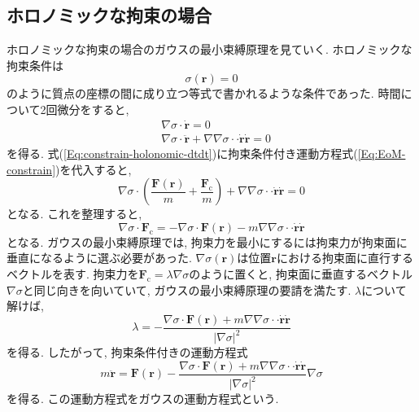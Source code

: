 \subsection{ホロノミックな拘束の場合}
ホロノミックな拘束の場合のガウスの最小束縛原理を見ていく.
ホロノミックな拘束条件は
\begin{equation}
    \sigma (\bm{r}) = 0
\end{equation}
のように質点の座標の間に成り立つ等式で書かれるような条件であった.
時間について2回微分をすると,
\begin{align}
    &
    \nabla \sigma \cdot \dot{\bm{r}} = 0
    \\
    &
    \nabla \sigma \cdot \ddot{\bm{r}} +
    \nabla \nabla \sigma \cdot\cdot \dot{\bm{r}} \dot{\bm{r}} = 0
    \label{Eq:constrain-holonomic-dtdt}
\end{align}
を得る. 式(\ref{Eq:constrain-holonomic-dtdt})に拘束条件付き運動方程式(\ref{Eq:EoM-constrain})を代入すると,
\begin{equation}
    \nabla \sigma \cdot
    \left(
        \frac{\bm{F}(\bm{r})}{m}
        +
        \frac{\bm{F}_{\mathrm{c}}}{m}
    \right)
    +
    \nabla \nabla \sigma \cdot\cdot \dot{\bm{r}} \dot{\bm{r}}
    =
    0
\end{equation}
となる. これを整理すると,
\begin{equation}
    \nabla\sigma \cdot \bm{F}_{\mathrm{c}}
    =
    -
    \nabla\sigma \cdot \bm{F}(\bm{r})
    - m
    \nabla \nabla \sigma \cdot\cdot \dot{\bm{r}} \dot{\bm{r}}
\end{equation}
となる.
ガウスの最小束縛原理では, 拘束力を最小にするには拘束力が拘束面に垂直になるように選ぶ必要があった.
$\nabla \sigma(\bm{r})$は位置$\bm{r}$における拘束面に直行するベクトルを表す.
拘束力を$\bm{F}_{\mathrm{c}} = \lambda \nabla \sigma$のように置くと, 拘束面に垂直するベクトル$\nabla \sigma$と同じ向きを向いていて, ガウスの最小束縛原理の要請を満たす.
$\lambda$について解けば,
\begin{equation}
    \lambda=
    -
    \frac{\nabla\sigma \cdot \bm{F}(\bm{r}) + m
    \nabla \nabla \sigma \cdot\cdot \dot{\bm{r}} \dot{\bm{r}}}{|\nabla \sigma|^{2}}
\end{equation}
を得る. したがって, 拘束条件付きの運動方程式
\begin{equation}
    m \ddot{\bm{r}}
    =
    \bm{F}(\bm{r})
    -
    \frac{\nabla\sigma \cdot \bm{F}(\bm{r}) + m
    \nabla \nabla \sigma \cdot\cdot \dot{\bm{r}} \dot{\bm{r}}}{|\nabla \sigma|^{2}}
    \nabla \sigma
\end{equation}
を得る. この運動方程式をガウスの運動方程式という.

